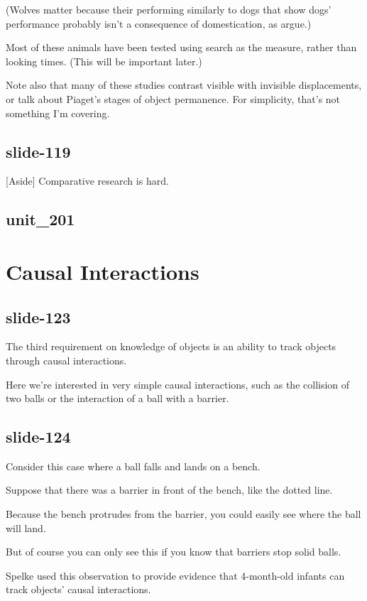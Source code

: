 \documentclass[12pt,\papersize]{extarticle}
\begin{document}
(Wolves matter because their performing similarly to dogs that show dogs' performance probably isn't a consequence of domestication, as \citet{fiset:2013_object} argue.)
 
Most of these animals have been tested using search as the measure, rather than looking times.
 (This will be important later.)
 
 
 
Note also that many of these studies contrast visible with invisible displacements, or talk about Piaget's stages of object permanence.  For simplicity, that's not something I'm covering.
 
\subsection{slide-119}
[Aside] Comparative research is hard.
 
\subsection{unit\_201}
 
 
\section{Causal Interactions}
 
\subsection{slide-123}
The third requirement on knowledge of objects is an ability to track
objects through causal interactions.
 
Here we're interested in very simple causal interactions, such as the
collision of two balls or the interaction of a ball with a barrier.
 
\subsection{slide-124}
Consider this case where a ball falls and lands on a bench.
 
Suppose that there was a barrier in front of the bench, like the dotted line.
 
Because the bench protrudes from the barrier, you could easily see where the ball will land.
 
But of course you can only see this if you know that barriers stop solid balls.
 
Spelke used this observation to provide evidence that 4-month-old infants can track objects' causal interactions.
 
\end{document}
